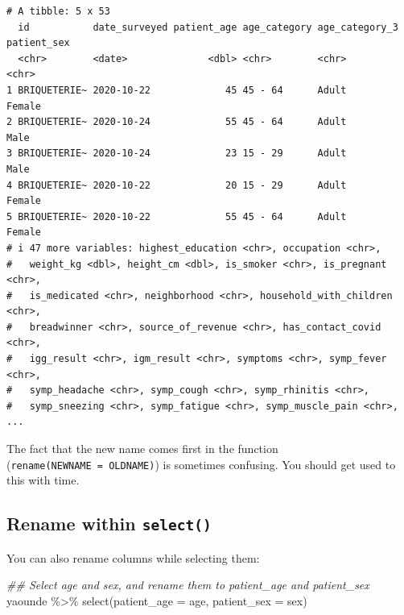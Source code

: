 \documentclass[
  letterpaper,
  DIV=11,
  numbers=noendperiod]{scrreprt}
\newenvironment{Shaded}{\begin{snugshade}}{\end{snugshade}}
\newcommand{\AttributeTok}[1]{\textcolor[rgb]{0.40,0.45,0.13}{#1}}
\newcommand{\DocumentationTok}[1]{\textcolor[rgb]{0.37,0.37,0.37}{\textit{#1}}}
\newcommand{\FunctionTok}[1]{\textcolor[rgb]{0.28,0.35,0.67}{#1}}
\newcommand{\NormalTok}[1]{\textcolor[rgb]{0.00,0.23,0.31}{#1}}
\newcommand{\SpecialCharTok}[1]{\textcolor[rgb]{0.37,0.37,0.37}{#1}}
\begin{document}
\begin{verbatim}
# A tibble: 5 x 53
  id           date_surveyed patient_age age_category age_category_3 patient_sex
  <chr>        <date>              <dbl> <chr>        <chr>          <chr>      
1 BRIQUETERIE~ 2020-10-22             45 45 - 64      Adult          Female     
2 BRIQUETERIE~ 2020-10-24             55 45 - 64      Adult          Male       
3 BRIQUETERIE~ 2020-10-24             23 15 - 29      Adult          Male       
4 BRIQUETERIE~ 2020-10-22             20 15 - 29      Adult          Female     
5 BRIQUETERIE~ 2020-10-22             55 45 - 64      Adult          Female     
# i 47 more variables: highest_education <chr>, occupation <chr>,
#   weight_kg <dbl>, height_cm <dbl>, is_smoker <chr>, is_pregnant <chr>,
#   is_medicated <chr>, neighborhood <chr>, household_with_children <chr>,
#   breadwinner <chr>, source_of_revenue <chr>, has_contact_covid <chr>,
#   igg_result <chr>, igm_result <chr>, symptoms <chr>, symp_fever <chr>,
#   symp_headache <chr>, symp_cough <chr>, symp_rhinitis <chr>,
#   symp_sneezing <chr>, symp_fatigue <chr>, symp_muscle_pain <chr>, ...
\end{verbatim}

\begin{tcolorbox}[enhanced jigsaw, colframe=quarto-callout-caution-color-frame, rightrule=.15mm, opacityback=0, breakable, coltitle=black, colbacktitle=quarto-callout-caution-color!10!white, bottomrule=.15mm, leftrule=.75mm, toprule=.15mm, arc=.35mm, bottomtitle=1mm, colback=white, left=2mm, opacitybacktitle=0.6, titlerule=0mm, title=\textcolor{quarto-callout-caution-color}{\faFire}\hspace{0.5em}{Watch Out}, toptitle=1mm]

The fact that the new name comes first in the function
(\texttt{rename(NEWNAME\ =\ OLDNAME)}) is sometimes confusing. You
should get used to this with time.

\end{tcolorbox}

\hypertarget{rename-within-select}{%
\subsection{\texorpdfstring{Rename within
\texttt{select()}}{Rename within select()}}\label{rename-within-select}}

You can also rename columns while selecting them:

\begin{Shaded}
\begin{Highlighting}[]
\DocumentationTok{\#\# Select \textasciigrave{}age\textasciigrave{} and \textasciigrave{}sex\textasciigrave{}, and rename them to \textasciigrave{}patient\_age\textasciigrave{} and \textasciigrave{}patient\_sex\textasciigrave{}}
\NormalTok{yaounde }\SpecialCharTok{\%\textgreater{}\%} 
  \FunctionTok{select}\NormalTok{(}\AttributeTok{patient\_age =}\NormalTok{ age, }
         \AttributeTok{patient\_sex =}\NormalTok{ sex)}
\end{Highlighting}
\end{Shaded}
\end{document}
